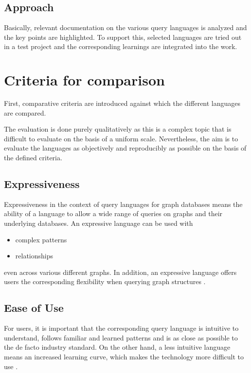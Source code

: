 \section{Approach}
\label{sec:intro:approach}
Basically, relevant documentation on the various query languages is analyzed 
and the key points are highlighted. 
To support this, selected languages are tried out in a test project 
and the corresponding learnings are integrated into the work.


\chapter{Criteria for comparison}
\label{ch:criteria_for_comparison}
First, comparative criteria are introduced against which the different languages are compared.

The evaluation is done purely qualitatively as this is a complex topic that is difficult to evaluate on the basis of a uniform scale. 
Nevertheless, the aim is to evaluate the languages as objectively and reproducibly as possible on the basis of the defined criteria.

\section{Expressiveness}
\label{sec:criteria_for_comparison:expressiveness}
Expressiveness in the context of query languages for graph databases means the ability 
of a language to allow a wide range of queries on graphs and their underlying databases.
An expressive language can be used with
\begin{itemize}
	\item complex patterns
	\item relationships
\end{itemize}
even across various different graphs.
In addition, an expressive language offers users the corresponding flexibility
when querying graph structures \citep{barcelo_expressive_2012}.

\section{Ease of Use}
\label{sec:criteria_for_comparison:ease_of_use}
For users, it is important that the corresponding query language is intuitive to understand, follows familiar and learned patterns 
and is as close as possible to the de facto industry standard. 
On the other hand, a less intuitive language means an increased learning curve, 
which makes the technology more difficult to use \citep{barcelo_expressive_2012}.

